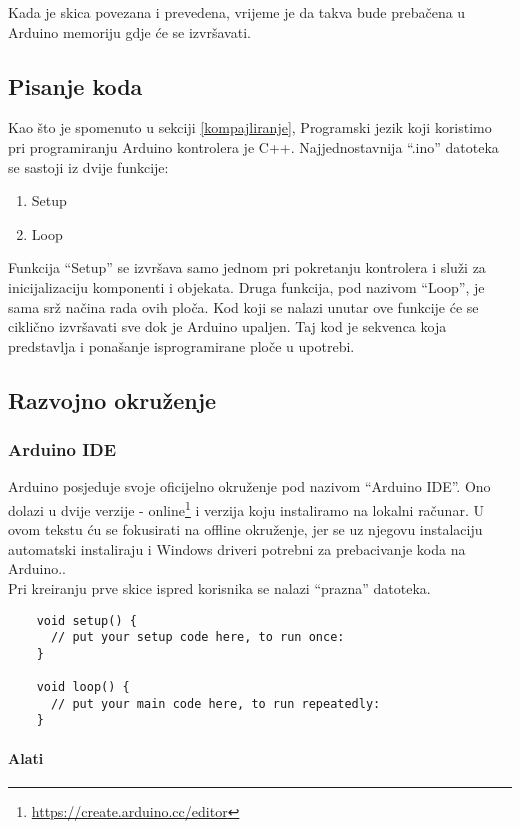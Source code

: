 \documentclass[../Document.tex]{subfiles}
\begin{document}
Kada je skica povezana i prevedena, vrijeme je da takva bude prebačena u Arduino memoriju gdje će se izvršavati.

\subsection{Pisanje koda}
Kao što je spomenuto u sekciji \ref{kompajliranje}, Programski jezik koji koristimo pri programiranju Arduino kontrolera je C++. Najjednostavnija ``.ino'' datoteka se sastoji iz dvije funkcije:

\begin{enumerate}
  \item Setup
  \item Loop
\end{enumerate}

Funkcija ``Setup'' se izvršava samo jednom pri pokretanju kontrolera i služi za inicijalizaciju komponenti i objekata. Druga funkcija, pod nazivom ``Loop'', je sama srž načina rada ovih ploča. Kod koji se nalazi unutar ove funkcije će se ciklično izvršavati sve dok je Arduino upaljen. Taj kod je sekvenca koja predstavlja i ponašanje isprogramirane ploče u upotrebi.

\subsection{Razvojno okruženje}
\subsubsection{Arduino IDE}
Arduino posjeduje svoje oficijelno okruženje pod nazivom ``Arduino IDE''. Ono dolazi u dvije verzije - online\footnote{\url{https://create.arduino.cc/editor}} i verzija koju instaliramo na lokalni računar. U ovom tekstu ću se fokusirati na offline okruženje, jer se uz njegovu instalaciju automatski instaliraju i Windows driveri potrebni za prebacivanje koda na Arduino..\\

\noindent Pri kreiranju prve skice ispred korisnika se nalazi ``prazna'' datoteka.

\begin{verbatim}
    void setup() {
      // put your setup code here, to run once:
    }

    void loop() {
      // put your main code here, to run repeatedly:
    }
\end{verbatim}

\paragraph{Alati}
\end{document}
